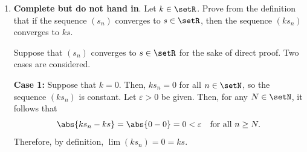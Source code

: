 \begin{enumerate}
\begin{subprove}
    First, it is established that there exists a constant \(m > 0\) and an integer \(N_1\) such that \(t_n > m\) for all \(n > N_1\). 
    The limit of \(t_n\) will be considered in two mutually exclusive cases as follows.
    
    \begin{enumerate}
      \item Suppose \(\lim t_n = L\) where \(L \in \setR\) and \(L > 0\).
      Let \(m = L/2\). Since \(L > 0\), it follows that \(m > 0\).
      Since \(\lim t_n = L > m\), by question (\ref{prob:limit-inequality}) (with \(a=m\)), there exists \(N_1 \in \setN\) such that 
      \[
        t_n > m \quad\text{for all } n > N_1.
      \]

      \item Suppose \(\lim t_n = +\infty\).
      By , there exists \(N_1 \in \setN\) such that 
      \[
        t_n > 1 \quad\text{for all } n > N_1.
      \]
    \end{enumerate}

    Thus, a constant \(m > 0\) and an index \(N_1\) have been found such that \(t_n > m\) for all \(n > N_1\).
    Furthermore, by the assumption, \(\lim s_n = +\infty\).
    Let \(K > 0\) be an arbitrary positive real number.
    Since \(m > 0\), it follows that \(\frac{K}{m} > 0\) is also an arbitrary positive real number.
    Then, by definition, there exists \(N_2 \in \setN\) such that
    \[
      s_n > \frac{K}{m} > 0 \quad\text{for all } n > N_2.
    \]
    Let \(N = \max\{N_1, N_2\}\). Then, for all \(n > N\), it follows that
    \[
      s_n t_n > \frac{K}{m} \cdot m = K > 0.
    \]
    Since \(K\) was arbitrary, by definition, \(\lim s_n t_n = +\infty\).
  \end{subprove}








  \newpage

  \item \textbf{Complete but do not hand in}. 
  Let \(k \in \setR\). Prove from the definition that if the 
  sequence \((s_n)\) converges to \(s \in \setR\), then the 
  sequence \((k s_n)\) converges to \(k s\).
  \begin{subprove}
    Suppose that \((s_n)\) converges to \(s \in \setR\) for the sake of direct proof.
    Two cases are considered.
    
    \textbf{Case 1:} Suppose that \(k = 0\).
    Then, \(k s_n = 0\) for all \(n \in \setN\), so the sequence \((k s_n)\) is constant.
    Let \(\varepsilon > 0\) be given. Then, for any \(N \in \setN\), it follows that
    \[
      \abs{k s_n - k s} = \abs{0 - 0} = 0 < \varepsilon \quad\text{for all } n \geq N.
    \]
    Therefore, by definition, \(\lim (k s_n) = 0 = k s\).
    

\end{subprove}
\end{enumerate}
